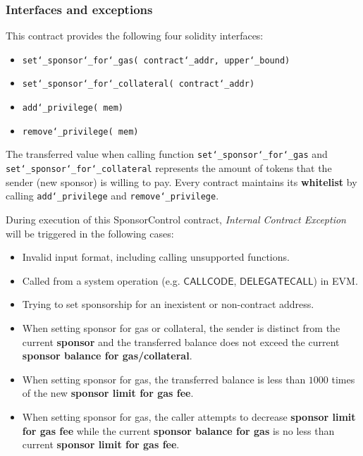 \subsubsection{Interfaces and exceptions}

This contract provides the following four solidity interfaces:
\begin{itemize}[nosep]
	\item {\tt set\char`_sponsor\char`_for\char`_gas( contract\char`_addr,  upper\char`_bound)}
    \item {\tt set\char`_sponsor\char`_for\char`_collateral( contract\char`_addr)}
    \item {\tt add\char`_privilege( mem)}
    \item {\tt remove\char`_privilege( mem)}
\end{itemize}

The transferred value when calling function {\tt set\char`_sponsor\char`_for\char`_gas} and {\tt set\char`_sponsor\char`_for\char`_collateral} represents the amount of tokens that the sender (new sponsor) is willing to pay.
Every contract maintains its {\bf whitelist} by calling {\tt add\char`_privilege} and {\tt remove\char`_privilege}.

During execution of this SponsorControl contract, \emph{Internal Contract Exception} will be triggered in the following cases:
\begin{itemize}[nosep]
	\item Invalid input format, including calling unsupported functions.
	\item Called from a system operation (e.g. $\mathsf{CALLCODE}$, $\mathsf{DELEGATECALL}$) in EVM.
    \item Trying to set sponsorship for an inexistent or non-contract address.
    \item When setting sponsor for gas or collateral, the sender is distinct from the current \textbf{sponsor} and the transferred balance does not exceed the current \textbf{sponsor balance for gas/collateral}.
    \item When setting sponsor for gas, the transferred balance is less than $1000$ times of the new \textbf{sponsor limit for gas fee}.
    \item When setting sponsor for gas, the caller attempts to decrease \textbf{sponsor limit for gas fee} while the current \textbf{sponsor balance for gas} is no less than current \textbf{sponsor limit for gas fee}. 
\end{itemize}

